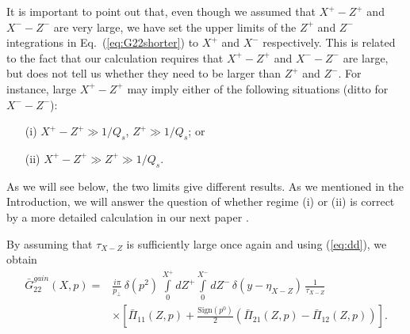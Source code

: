 \documentclass[onecolumn,showpacs,nobibnotes,nofootinbib,12pt,aps,prd,showpacs,notitlepage,nofootinbib,preprintnumbers,amsmath,amssymb]{article}
\def\eq#1{{Eq.~(\ref{#1})}}
\begin{document}
It is important to point out that, even though we assumed that $X^+ -
Z^+$ and $X^- - Z^-$ are very large, we have set the upper limits of
the $Z^+$ and $Z^-$ integrations in \eq{eq:G22shorter} to $X^+$ and
$X^-$ respectively. This is related to the fact that our calculation
requires that $X^+ - Z^+$ and $X^- - Z^-$ are large, but does not tell
us whether they need to be larger than $Z^+$ and $Z^-$. For instance,
large $X^+ - Z^+$ may imply either of the following situations (ditto
for $X^- - Z^-$):
\begin{itemize}
\item[(i)] $X^+ - Z^+ \gg 1/Q_s$, $Z^+ \gg 1/Q_s$; or
\item[(ii)] $X^+ - Z^+ \gg Z^+ \gg 1/Q_s$.
\end{itemize}
As we will see below, the two limits give different results. As we
mentioned in the Introduction, we will answer the question of whether
regime (i) or (ii) is correct by a more detailed calculation in our
next paper \cite{KovchegovWu}.


By assuming that $\tau_{X-Z}$ is sufficiently large once again and
using (\ref{eq:dd}), we obtain
\begin{align}
  \bar G_{22}^{gain}(X,p)=&\frac{i\pi}{p_\perp} \, \delta(p^2) \,
  \int\limits_0^{X^+} dZ^+ \int\limits_0^{X^-} dZ^- \, \delta(y-\eta_{X-Z}) \, \frac{1}{\tau_{X-Z}} \nonumber\\
  &\times\left[\bar\Pi_{11}(Z,p)+\frac{\mbox{Sign} (p^0)}{2}
    \left(\bar\Pi_{21}(Z,p)-\bar\Pi_{12}(Z,p)\right)\right].
\label{eq:G22gainPi}
\end{align}
\end{document}
